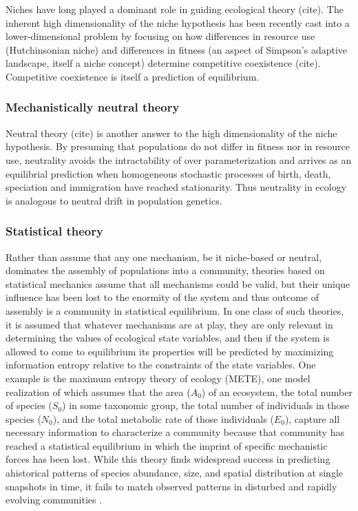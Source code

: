 \documentclass[12pt]{article}
\begin{document}
Niches have long played a dominant role in guiding ecological theory
(cite). The inherent high dimensionality of the niche hypothesis has
been recently cast into a lower-dimensional problem by focusing on how
differences in resource use (Hutchinsonian niche) and differences in
fitness (an aspect of Simpson's adaptive landscape, itself a niche
concept) determine competitive coexistence (cite). Competitive
coexistence is itself a prediction of equilibrium.

\subsubsection{Mechanistically neutral theory}

Neutral theory (cite) is another answer to the high dimensionality of
the niche hypothesis. By presuming that populations do not differ in
fitness nor in resource use, neutrality avoids the intractability of
over parameterization and arrives as an equilibrial prediction when
homogeneous stochastic processes of birth, death, speciation and
immigration have reached stationarity. Thus neutrality in ecology is
analogous to neutral drift in population genetics.

\subsubsection{Statistical theory}

Rather than assume that any one mechanism, be it niche-based or
neutral, dominates the assembly of populations into a community,
theories based on statistical mechanics assume that all mechanisms
could be valid, but their unique influence has been lost to the
enormity of the system and thus outcome of assembly is a community in
statistical equilibrium. In one class of such theories, it is assumed
that whatever mechanisms are at play, they are only relevant in
determining the values of ecological state variables, and then if the
system is allowed to come to equilibrium its properties will be
predicted by maximizing information entropy relative to the
constraints of the state variables.  One example is the maximum
entropy theory of ecology (METE), one model realization of which
assumes that the area ($A_0$) of an ecosystem, the total number of species
($S_0$) in some taxonomic group, the total number of individuals in those
species ($N_0$), and the total metabolic rate of those individuals ($E_0$),
capture all necessary information to characterize a community because
that community has reached a statistical equilibrium in which the
imprint of specific mechanistic forces has been lost. While this
theory finds widespread success in predicting ahistorical patterns of
species abundance, size, and spatial distribution \cite{Harte2011-um,
  White2012-yw, Xiao2015-jv, Harte2009-zq} at single snapshots in
time, it fails to match observed patterns in disturbed and rapidly
evolving communities \cite{Rominger2015-kb,Harte2011-um}.
\end{document}
